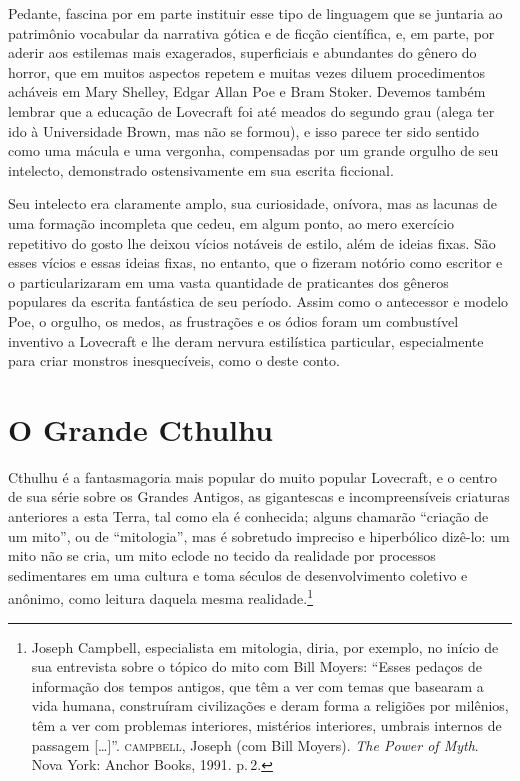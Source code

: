 Pedante, fascina por em parte instituir esse tipo de linguagem que se
juntaria ao patrimônio vocabular da narrativa gótica e de ficção
científica, e, em parte, por aderir aos estilemas mais exagerados,
superficiais e abundantes do gênero do horror, que em muitos aspectos
repetem e muitas vezes diluem procedimentos acháveis em Mary Shelley,
Edgar Allan Poe e Bram Stoker. Devemos também lembrar que a educação de
Lovecraft foi até meados do segundo grau (alega ter ido à Universidade
Brown, mas não se formou), e isso parece ter sido sentido como uma
mácula e uma vergonha, compensadas por um grande orgulho de seu
intelecto, demonstrado ostensivamente em sua escrita ficcional.

Seu intelecto era claramente amplo, sua curiosidade, onívora, mas as
lacunas de uma formação incompleta que cedeu, em algum ponto, ao mero
exercício repetitivo do gosto lhe deixou vícios notáveis de estilo, além de
ideias fixas. São esses vícios e essas ideias fixas, no entanto, que o
fizeram notório como escritor e o particularizaram em uma vasta
quantidade de praticantes dos gêneros populares da escrita fantástica de
seu período. Assim como o antecessor e modelo Poe, o orgulho, os medos,
as frustrações e os ódios foram um combustível inventivo a Lovecraft e lhe deram
nervura estilística particular, especialmente para criar monstros
inesquecíveis, como o deste conto.

\section{O Grande Cthulhu}

Cthulhu é a fantasmagoria mais popular do muito popular
Lovecraft, e o centro de sua série sobre os Grandes Antigos, as
gigantescas e incompreensíveis criaturas anteriores a esta Terra, tal
como ela é conhecida; alguns chamarão ``criação de um mito'', ou de 
``mitologia'', mas é sobretudo impreciso e hiperbólico dizê-lo: um mito
não se cria, um mito eclode no tecido da realidade por processos
sedimentares em uma cultura e toma séculos de desenvolvimento
coletivo e anônimo, como leitura daquela mesma realidade.\footnote{Joseph
  Campbell, especialista em mitologia, diria, por exemplo, no início de
  sua entrevista sobre o tópico do mito com Bill Moyers: ``Esses pedaços
  de informação dos tempos antigos, que têm a ver com temas que basearam
  a vida humana, construíram civilizações e deram forma a religiões por
  milênios, têm a ver com problemas interiores, mistérios interiores,
  umbrais internos de passagem [\ldots{}]''. \textsc{campbell}, Joseph (com Bill
  Moyers). \emph{The Power of Myth}. Nova York: Anchor Books, 1991. p.\,2.}

